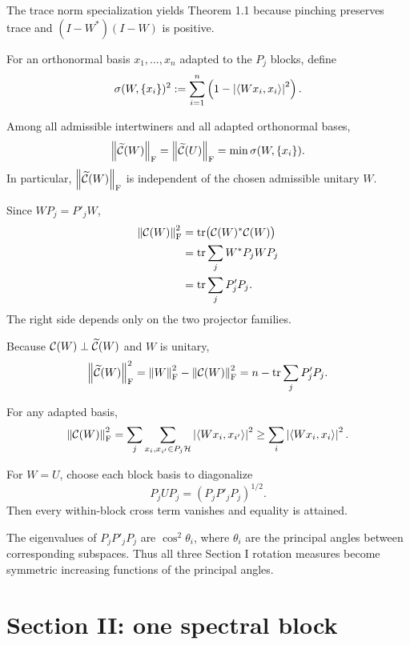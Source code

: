 The trace norm specialization yields Theorem 1.1 because pinching preserves trace and $(I-W^*)(I-W)$ is positive.

For an orthonormal basis $x_1,\dots,x_n$ adapted to the $P_j$ blocks, define
\[
  \sigma(W,\{x_i\})^2
  :=\sum_{i=1}^n\left(1-\left\lvert \left\langle Wx_i,x_i\right\rangle\right\rvert^2\right).
\]

\begin{theorem}
Among all admissible intertwiners and all adapted orthonormal bases,
\[
  \left\lVert \widetilde{\mathcal{C}}(W)\right\rVert_{\mathrm{F}}
  =\left\lVert \widetilde{\mathcal{C}}(U)\right\rVert_{\mathrm{F}}
  =\min \sigma(W,\{x_i\}).
\]
In particular, $\left\lVert \widetilde{\mathcal{C}}(W)\right\rVert_{\mathrm{F}}$ is independent of the chosen admissible unitary $W$.
\end{theorem}

\begin{argument}
\item Since $WP_j=P'_jW$,
\begin{align*}
  \left\lVert \mathcal{C}(W)\right\rVert_{\mathrm{F}}^2
  &=\operatorname{tr}\bigl(\mathcal{C}(W)^*\mathcal{C}(W)\bigr)\\
  &=\operatorname{tr}\sum_j W^*P_jWP_j\\
  &=\operatorname{tr}\sum_j P'_jP_j.
\end{align*}
The right side depends only on the two projector families.
\item Because $\mathcal{C}(W)\perp\widetilde{\mathcal{C}}(W)$ and $W$ is unitary,
\[
  \left\lVert \widetilde{\mathcal{C}}(W)\right\rVert_{\mathrm{F}}^2
  =\left\lVert W\right\rVert_{\mathrm{F}}^2-\left\lVert \mathcal{C}(W)\right\rVert_{\mathrm{F}}^2
  =n-\operatorname{tr}\sum_jP'_jP_j.
\]
\item For any adapted basis,
\[
  \left\lVert \mathcal{C}(W)\right\rVert_{\mathrm{F}}^2
  =\sum_{j}\sum_{x_i,x_{i'}\in P_j\mathcal{H}}
    \left\lvert \left\langle Wx_i,x_{i'}\right\rangle\right\rvert^2
  \ge \sum_i\left\lvert \left\langle Wx_i,x_i\right\rangle\right\rvert^2.
\]
\item For $W=U$, choose each block basis to diagonalize
\[
  P_jUP_j=(P_jP'_jP_j)^{1/2}.
\]
Then every within-block cross term vanishes and equality is attained.
\end{argument}

The eigenvalues of $P_jP'_jP_j$ are $\cos^2\theta_i$, where $\theta_i$ are the principal angles between corresponding subspaces. Thus all three Section I rotation measures become symmetric increasing functions of the principal angles.


\section{Section II: one spectral block}


